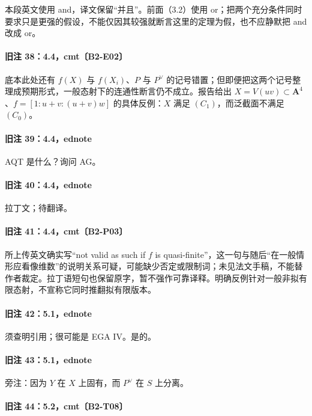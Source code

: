 \documentclass[UTF8,a4paper]{ctexbook}
\begin{document}
本段英文使用 and，译文保留“并且”。前面（3.2）使用 or；把两个充分条件同时要求只是更强的假设，不能仅因其较强就断言这里的定理为假，也不应静默把 and 改成 or。

\paragraph{旧注 38：4.4，cmt〔B2-E02〕}

底本此处还有 $f(X)$ 与 $f(X_i)$、$P$ 与 $P^\vee$ 的记号错置；但即便把这两个记号整理成预期形式，一般态射下的连通性断言仍不成立。报告给出 $X=V(uv)\subset\mathbf A^4$、$f=[1:u+v:(u+v)w]$ 的具体反例：$X$ 满足 $(C_1)$，而泛截面不满足 $(C_0)$。

\paragraph{旧注 39：4.4，ednote}

AQT 是什么？询问 AG。

\paragraph{旧注 40：4.4，ednote}

拉丁文；待翻译。

\paragraph{旧注 41：4.4，cmt〔B2-P03〕}

所上传英文确实写“not valid as such if $f$ is quasi-finite”，这一句与随后“在一般情形应看像维数”的说明关系可疑，可能缺少否定或限制词；未见法文手稿，不能替作者裁定。拉丁语短句也保留原字，暂不强作可靠译释。明确反例针对一般非拟有限态射，不宣称它同时推翻拟有限版本。

\paragraph{旧注 42：5.1，ednote}

须查明引用；很可能是 EGA IV。是的。

\paragraph{旧注 43：5.1，ednote}

旁注：因为 $Y$ 在 $X$ 上固有，而 $P^\vee$ 在 $S$ 上分离。

\paragraph{旧注 44：5.2，cmt〔B2-T08〕}
\end{document}
